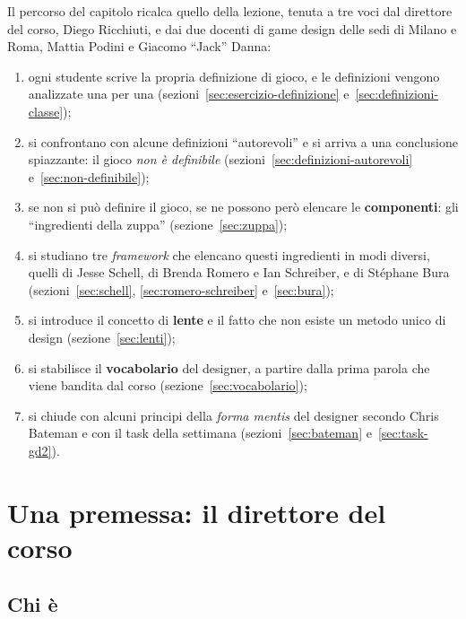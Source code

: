 Il percorso del capitolo ricalca quello della lezione, tenuta a tre voci dal
direttore del corso, Diego Ricchiuti, e dai due docenti di game design delle
sedi di Milano e Roma, Mattia Podini e Giacomo ``Jack'' Danna:
\begin{enumerate}
  \item ogni studente scrive la propria definizione di gioco, e le definizioni
        vengono analizzate una per una (sezioni~\ref{sec:esercizio-definizione}
        e~\ref{sec:definizioni-classe});
  \item si confrontano con alcune definizioni ``autorevoli'' e si arriva a una
        conclusione spiazzante: il gioco \emph{non è definibile}
        (sezioni~\ref{sec:definizioni-autorevoli} e~\ref{sec:non-definibile});
  \item se non si può definire il gioco, se ne possono però elencare le
        \textbf{componenti}: gli ``ingredienti della zuppa''
        (sezione~\ref{sec:zuppa});
  \item si studiano tre \emph{framework} che elencano questi ingredienti in
        modi diversi, quelli di Jesse Schell, di Brenda Romero e Ian
        Schreiber, e di Stéphane Bura (sezioni~\ref{sec:schell},
        \ref{sec:romero-schreiber} e~\ref{sec:bura});
  \item si introduce il concetto di \textbf{lente} e il fatto che non esiste un
        metodo unico di design (sezione~\ref{sec:lenti});
  \item si stabilisce il \textbf{vocabolario} del designer, a partire dalla
        prima parola che viene bandita dal corso (sezione~\ref{sec:vocabolario});
  \item si chiude con alcuni principi della \emph{forma mentis} del designer
        secondo Chris Bateman e con il task della settimana
        (sezioni~\ref{sec:bateman} e~\ref{sec:task-gd2}).
\end{enumerate}

\section{Una premessa: il direttore del corso}
\label{sec:premessa-direttore}

\subsection{Chi è}

